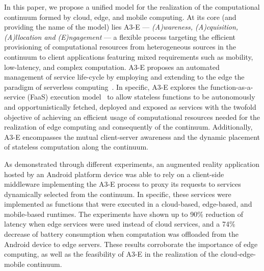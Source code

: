 In this paper, we propose a unified model for the realization of the computational continuum formed by cloud, edge, and mobile computing. At its core (and providing the name of the model) lies A3-E --- \textit{(A)wareness, (A)cquisition, (A)llocation and (E)ngagement} --- a flexible process targeting the efficient provisioning of computational resources from heterogeneous sources in the continuum to client applications featuring mixed requirements such as mobility, low-latency, and complex computation. 
A3-E proposes an automated management of service life-cycle by employing and extending to the edge the paradigm of serverless computing~\cite{Hendrickson:2016,baldini2017serverless,GarrigaMendonca2017}. In specific, A3-E explores the function-as-a-service (FaaS) execution model~\cite{MateosFaaster17} to allow stateless functions to be autonomously and opportunistically fetched, deployed and exposed as services with the twofold objective of achieving an efficient usage of computational resources needed for the realization of edge computing and consequently of the continuum. Additionally, A3-E encompasses the mutual client-server awareness and the dynamic placement of stateless computation along the continuum.

As demonstrated through different experiments, an augmented reality application hosted by an Android platform device was able to rely on a client-side middleware implementing the A3-E process to proxy its requests to services dynamically selected from the continuum. In specific, these services were implemented as functions that were executed in a cloud-based, edge-based, and mobile-based runtimes. The experiments have shown up to 90\% reduction of latency when edge services were used instead of cloud services, and a 74\% decrease of battery consumption when computation was offloaded from the Android device to edge servers. These results corroborate the importance of edge computing, as well as the feasibility of A3-E in the realization of the cloud-edge-mobile continuum.



